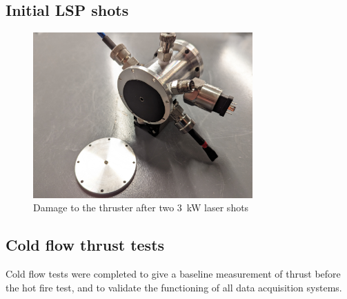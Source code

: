         \subsection{Initial LSP shots}

            \begin{figure}
                \centering
                \includegraphics[width=0.75\textwidth]{assets/5 results/V2 test damage.jpg}
                \caption{Damage to the thruster after two \qty{3}{kW} laser shots}
            \end{figure}

        
        \subsection{Cold flow thrust tests}

            Cold flow tests were completed to give a baseline measurement of thrust before the hot fire test, and to validate the functioning of all data acquisition systems.
            

        




